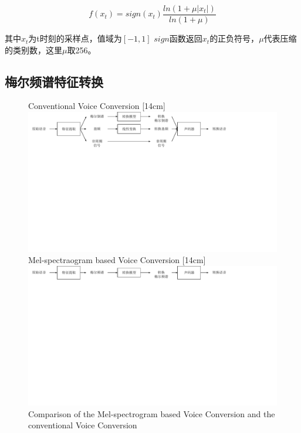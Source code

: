 \begin{equation}
    f(x_t) = sign(x_t)\frac{ln(1+\mu \left| x_t\right|)}{ln(1+\mu)}
\end{equation}

其中$x_t$为t时刻的采样点，值域为$\left[-1,1\right]$ $sign$函数返回$x_t$的正负符号，$\mu$代表压缩的类别数，这里$\mu$取256。


\subsection{梅尔频谱特征转换}

\begin{figure}[!hbtp]
    \centering
                    {Conventional Voice Conversion}%
                    [14cm]{\includegraphics[width=14cm,trim=0 300 140 0,clip]{figure/4_vcmcep.pdf}} \\
    \vspace{0.5cm}
                    {Mel-spectraogram based Voice Conversion}%
                    [14cm]{\includegraphics[width=14cm,trim=0 350 140 0,clip]{figure/4_vcmsp.pdf}}
              {Comparison of the Mel-spectrogram based Voice Conversion and the conventional Voice Conversion}
    \label{fig:vcdiff}
  \end{figure}

